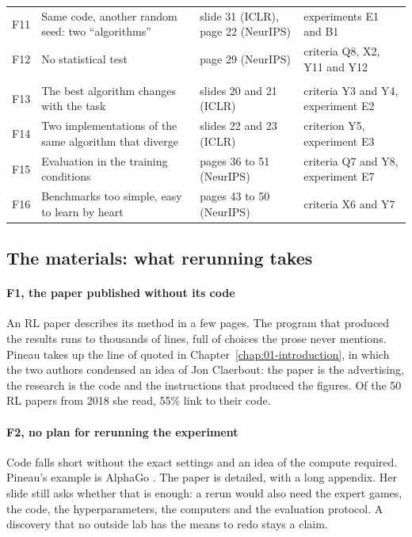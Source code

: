 \begin{small}
\begin{longtable}{@{}>{\raggedright\arraybackslash}p{0.6cm} >{\raggedright\arraybackslash}p{5.3cm} >{\raggedright\arraybackslash}p{3.6cm} >{\raggedright\arraybackslash}p{4.4cm}@{}}
F11 & Same code, another random seed: two \enquote{algorithms} & slide 31 (ICLR), page 22 (NeurIPS) & experiments E1 and B1 \\
F12 & No statistical test & page 29 (NeurIPS) & criteria Q8, X2, Y11 and Y12 \\
\midrule
\multicolumn{4}{@{}l}{\emph{The reach of the conclusions}} \\
F13 & The best algorithm changes with the task & slides 20 and 21 (ICLR) & criteria Y3 and Y4, experiment E2 \\
F14 & Two implementations of the same algorithm that diverge & slides 22 and 23 (ICLR) & criterion Y5, experiment E3 \\
F15 & Evaluation in the training conditions & pages 36 to 51 (NeurIPS) & criteria Q7 and Y8, experiment E7 \\
F16 & Benchmarks too simple, easy to learn by heart & pages 43 to 50 (NeurIPS) & criteria X6 and Y7 \\
\end{longtable}
\end{small}

\subsection{The materials: what rerunning takes}

\paragraph{F1, the paper published without its code}
An RL paper describes its method in a few pages. The program that produced the results runs to
thousands of lines, full of choices the prose never mentions. Pineau takes up the line of
\textcite{buckheit1995wavelab} quoted in Chapter~\ref{chap:01-introduction}, in which the two authors
condensed an idea of Jon Claerbout: the paper is the advertising, the research is the code and the instructions that
produced the figures. Of the 50 RL papers from 2018 she read, 55\% link to their code.

\paragraph{F2, no plan for rerunning the experiment}
Code falls short without the exact settings and an idea of the compute required. Pineau's example is
AlphaGo \parencite{silver2016alphago}. The paper is detailed, with a long appendix. Her slide still
asks whether that is enough: a rerun would also need the expert games, the code, the hyperparameters,
the computers and the evaluation protocol. A discovery that no outside lab has the means to redo stays
a claim.

